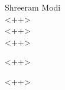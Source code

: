 \documentclass[12pt]{article}
\begin{document}
\begin{flushleft}

Shreeram Modi\\
<++>\\ %
<++>\\ %
<++>\\ %

\centerline{<++>} %

\setlength{\parindent}{0.5in} 

<++>

\end{flushleft}
\end{document}
